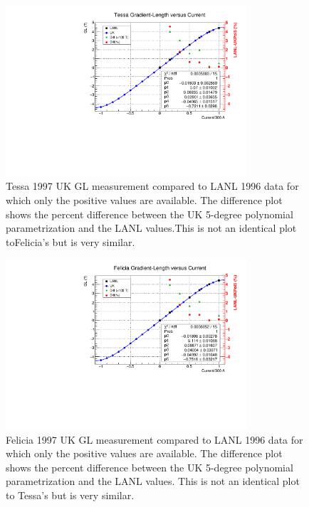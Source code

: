 \documentclass[12pt]{article}
\begin{document}
\begin{figure}[!h]
\centering
\includegraphics[width=0.8\textwidth]{Tes_LANL_UK_GLcomp.pdf}
\caption{\label{fig:Tes_LANL_UK_comp} Tessa 1997 UK GL measurement compared to LANL 1996 data for which only the positive values are available. The difference plot shows the percent difference between the UK 5-degree polynomial parametrization and the LANL values.This is not an identical plot toFelicia's but is very similar.}
\end{figure}


\begin{figure}[!h]
\centering
\includegraphics[width=0.8\textwidth]{Fel_LANL_UK_GLcomp.pdf}
\caption{\label{fig:Fel_LANL_UK_comp} Felicia 1997 UK GL measurement compared to LANL 1996 data for which only the positive values are available. The difference plot shows the percent difference between the UK 5-degree polynomial parametrization and the LANL values. This is not an identical plot to Tessa's but is very similar.}
\end{figure}
\end{document}
